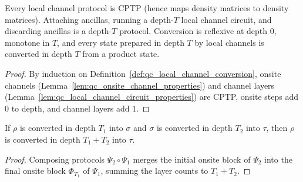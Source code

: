 \begin{lemma}
    \label{lem:qc_local_channel_conversion_properties}
    \leanok
    Every local channel protocol is CPTP (hence maps density matrices to density matrices). Attaching ancillas, running a depth-$T$ local channel circuit, and discarding ancillas is a depth-$T$ protocol. Conversion is reflexive at depth $0$, monotone in $T$, and every state prepared in depth $T$ by local channels is converted in depth $T$ from a product state.
\end{lemma}
\begin{proof}
    \leanok
    By induction on Definition~\ref{def:qc_local_channel_conversion}, onsite channels (Lemma~\ref{lem:qc_onsite_channel_properties}) and channel layers (Lemma~\ref{lem:qc_local_channel_circuit_properties}) are CPTP, onsite steps add $0$ to depth, and channel layers add $1$.
\end{proof}

\begin{lemma}
    \label{lem:qc_local_channel_conversion_trans}
    \leanok
    If $\rho$ is converted in depth $T_1$ into $\sigma$ and $\sigma$ is converted in depth $T_2$ into $\tau$, then $\rho$ is converted in depth $T_1+T_2$ into $\tau$.
\end{lemma}
\begin{proof}
    \leanok
    Composing protocols $\Psi_2\circ\Psi_1$ merges the initial onsite block of $\Psi_2$ into the final onsite block $\Phi_{T_1}$ of $\Psi_1$, summing the layer counts to $T_1+T_2$.
\end{proof}

